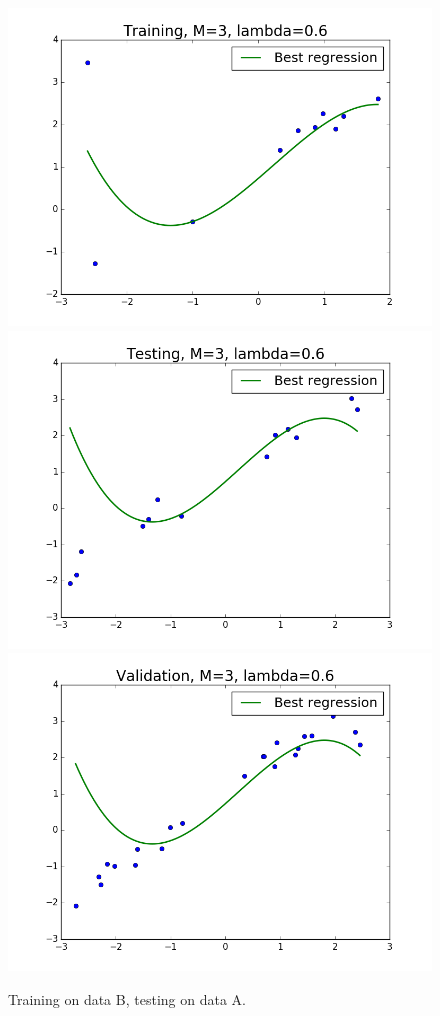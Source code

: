 \documentclass{article}
\begin{document}
\begin{figure}[width=\linewidth]
\centering
\begin{multicols}{2}
  \includegraphics[width=1.2\linewidth]{code/P3/training,training_b,testing_a.png}
  \includegraphics[width=1.2\linewidth]{code/P3/testing,training_b,testing_a.png}
  \includegraphics[width=1.2\linewidth]{code/P3/validation,training_b,testing_a.png}
\end{multicols}
\caption{Training on data B, testing on data A.}
\end{figure}
\end{document}
